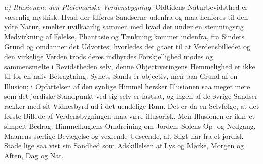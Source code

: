 \documentclass[12pt,a4paper]{book}
\newcommand{\runin}[1]{\emph{#1}\hspace{0.4em}}
\begin{document}
\runin{a) Illusionen: den Ptolemæiske Verdensbygning.} Oldtidens
Naturbevidsthed er væsenlig mythisk. Hvad der tilføres Sandserne
udenfra og maa henføres til den ydre Natur, smelter uvilkaarlig sammen
med hvad der under en stemningsrig Medvirkning af Følelse, Phantasie og
Tænkning kommer indenfra, fra Sindets Grund og omdanner det Udvortes;
hvorledes det gaaer til at Verdensbilledet og den virkelige Verden
trods deres indbyrdes Forskjellighed mødes og sammensmelte i
Bevidstheden selv, denne Objectiveringens Hemmelighed er ikke til for
en naiv Betragtning. Synets Sands er objectiv, men paa Grund af en
Illusion; i Opfattelsen af den synlige Himmel hersker Illusionen saa
meget mere som det jordiske Standpunkt ved sig selv er fastsat, og
ingen af de øvrige Sandser rækker med sit Vidnesbyrd ud i det uendelige
Rum. Det er da en Selvfølge, at det første Billede af
Verdensbygningen maa være illusorisk. Men Illusionen er ikke et simpelt
Bedrag. Himmelkuglens Omdreining om Jorden, Solens Op- og Nedgang,
Maanens særlige Bevægelse og vexlende Udseende, alt Sligt har fra et
jordisk Stade lige saa vist sin Sandhed som
Adskillelsen af Lys og Mørke, Morgen og Aften, Dag og Nat.
\end{document}
